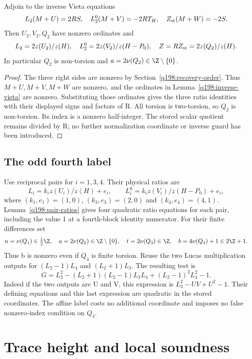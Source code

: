 \begin{lemma}\label{q198:scalar-ratios}
Adjoin to the inverse Vieta equations
\[
 L_2(M+U)=2RS,\quad L_2^0(M+V)=-2RT_H,\quad
 Z_{\rm st}(M+W)=-2S.
\]
Then $U_2,V_2,Q_2$ have nonzero ordinates and
\[
 L_2=2z(U_2)/z(H),\quad L_2^0=2z(V_2)/z(H-P_0),\quad
 Z=RZ_{\rm st}=2z(Q_2)/z(H).
\]
In particular $Q_2$ is non-torsion and
$a=2\nu(Q_2)\in\Z\setminus\{0\}$.
\end{lemma}
\begin{proof}
The three right sides are nonzero by Section~\ref{q198:recovery-order}.
Thus $M+U,M+V,M+W$ are nonzero, and the ordinates in
Lemma~\ref{q198:inverse-vieta} are nonzero. Substituting those
ordinates gives the three ratio identities with their displayed
signs and factors of R. All torsion is two-torsion, so $Q_2$ is
non-torsion. Its index is a nonzero half-integer. The stored scalar
quotient remains divided by R; no further normalization coordinate
or inverse guard has been introduced.
\end{proof}

\subsection{The odd fourth label}\label{q198:affine-fourth}
Use reciprocal pairs for $i=1,3,4$. Their physical ratios are
\[
 L_i=k_i z(U_i)/z(H)+e_i,\qquad
 L_i^0=k_i z(V_i)/z(H-P_0)+e_i,
\]
where $(k_1,e_1)=(1,0)$, $(k_3,e_3)=(2,0)$ and
$(k_4,e_4)=(4,1)$. Lemma~\ref{q198:pair-ratios} gives four
quadratic ratio equations for each pair, including the value 1 at
a fourth-block identity numerator. For their finite differences set
\[
 n=\nu(Q_1)\in\tfrac12\Z,\quad a=2\nu(Q_2)\in\Z\setminus\{0\},
 \quad t=2\nu(Q_3)\in\Z,\quad b=4\nu(Q_4)+1\in2\Z+1.
\]
Thus b is nonzero even if $Q_4$ is finite torsion. Reuse the two
Lucas multiplication outputs for $(L_2-1)L_4$ and $(L_2+1)L_3$.
The resulting test is
\begin{equation}\label{q198:lucas-test}
 G=L_3^2-(L_2+1)(L_2-1)L_3L_4+(L_2-1)^2L_4^2-1.
\end{equation}
Indeed if the two outputs are U and V, this expression is
$L_3^2-UV+U^2-1$. Their defining equations and this last expression
are quadratic in the stored coordinates. The affine label costs
no additional coordinate and imposes no false nonzero-index condition
on $Q_4$.

\section{Trace height and local soundness}\label{q198:height-local}

